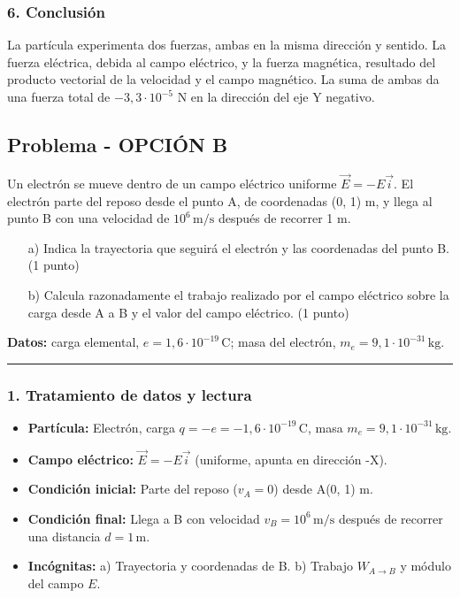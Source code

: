 \subsubsection*{6. Conclusión}
\begin{cajaconclusion}
La partícula experimenta dos fuerzas, ambas en la misma dirección y sentido. La fuerza eléctrica, debida al campo eléctrico, y la fuerza magnética, resultado del producto vectorial de la velocidad y el campo magnético. La suma de ambas da una fuerza total de $-3,3 \cdot 10^{-5}$ N en la dirección del eje Y negativo.
\end{cajaconclusion}
\newpage

\subsection{Problema - OPCIÓN B}
\label{subsec:B4B_2017_jun_ord}
\begin{cajaenunciado}
Un electrón se mueve dentro de un campo eléctrico uniforme $\vec{E}=-E\vec{i}$. El electrón parte del reposo desde el punto A, de coordenadas (0, 1) m, y llega al punto B con una velocidad de $10^{6}\,\text{m/s}$ después de recorrer 1 m.
\begin{enumerate}
    \item[a)] Indica la trayectoria que seguirá el electrón y las coordenadas del punto B. (1 punto)
    \item[b)] Calcula razonadamente el trabajo realizado por el campo eléctrico sobre la carga desde A a B y el valor del campo eléctrico. (1 punto)
\end{enumerate}
\textbf{Datos:} carga elemental, $e=1,6\cdot10^{-19}\,\text{C}$; masa del electrón, $m_{e}=9,1\cdot10^{-31}\,\text{kg}$.
\end{cajaenunciado}
\hrule

\subsubsection*{1. Tratamiento de datos y lectura}
\begin{itemize}
    \item \textbf{Partícula:} Electrón, carga $q=-e=-1,6\cdot10^{-19}\,\text{C}$, masa $m_e=9,1\cdot10^{-31}\,\text{kg}$.
    \item \textbf{Campo eléctrico:} $\vec{E}=-E\vec{i}$ (uniforme, apunta en dirección -X).
    \item \textbf{Condición inicial:} Parte del reposo ($v_A=0$) desde A(0, 1) m.
    \item \textbf{Condición final:} Llega a B con velocidad $v_B=10^6\,\text{m/s}$ después de recorrer una distancia $d=1\,\text{m}$.
    \item \textbf{Incógnitas:} a) Trayectoria y coordenadas de B. b) Trabajo $W_{A \to B}$ y módulo del campo $E$.
\end{itemize}

